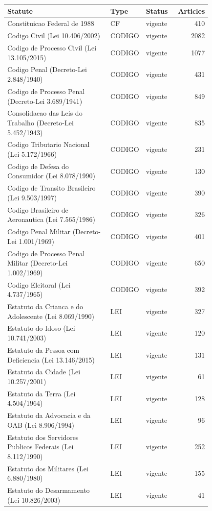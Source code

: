 \begin{longtable}{p{0.55\linewidth}p{0.12\linewidth}p{0.16\linewidth}r}
\hline\textbf{Statute} & \textbf{Type} & \textbf{Status} & \textbf{Articles}\\\hline\endhead
Constituicao Federal de 1988 & CF & vigente & 410\\
Codigo Civil (Lei 10.406/2002) & CODIGO & vigente & 2082\\
Codigo de Processo Civil (Lei 13.105/2015) & CODIGO & vigente & 1077\\
Codigo Penal (Decreto-Lei 2.848/1940) & CODIGO & vigente & 431\\
Codigo de Processo Penal (Decreto-Lei 3.689/1941) & CODIGO & vigente & 849\\
Consolidacao das Leis do Trabalho (Decreto-Lei 5.452/1943) & CODIGO & vigente & 835\\
Codigo Tributario Nacional (Lei 5.172/1966) & CODIGO & vigente & 231\\
Codigo de Defesa do Consumidor (Lei 8.078/1990) & CODIGO & vigente & 130\\
Codigo de Transito Brasileiro (Lei 9.503/1997) & CODIGO & vigente & 390\\
Codigo Brasileiro de Aeronautica (Lei 7.565/1986) & CODIGO & vigente & 326\\
Codigo Penal Militar (Decreto-Lei 1.001/1969) & CODIGO & vigente & 401\\
Codigo de Processo Penal Militar (Decreto-Lei 1.002/1969) & CODIGO & vigente & 650\\
Codigo Eleitoral (Lei 4.737/1965) & CODIGO & vigente & 392\\
Estatuto da Crianca e do Adolescente (Lei 8.069/1990) & LEI & vigente & 327\\
Estatuto do Idoso (Lei 10.741/2003) & LEI & vigente & 120\\
Estatuto da Pessoa com Deficiencia (Lei 13.146/2015) & LEI & vigente & 131\\
Estatuto da Cidade (Lei 10.257/2001) & LEI & vigente & 61\\
Estatuto da Terra (Lei 4.504/1964) & LEI & vigente & 128\\
Estatuto da Advocacia e da OAB (Lei 8.906/1994) & LEI & vigente & 96\\
Estatuto dos Servidores Publicos Federais (Lei 8.112/1990) & LEI & vigente & 252\\
Estatuto dos Militares (Lei 6.880/1980) & LEI & vigente & 155\\
Estatuto do Desarmamento (Lei 10.826/2003) & LEI & vigente & 41\\

\end{longtable}

